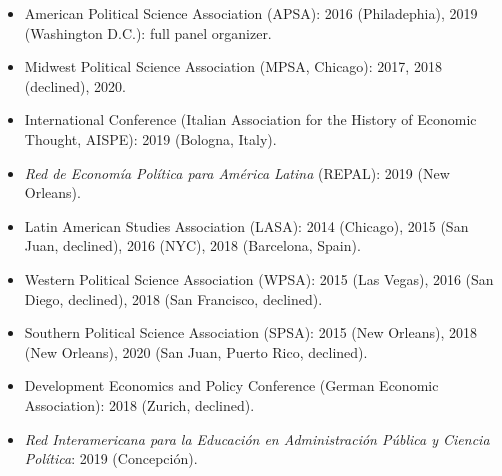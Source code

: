 \begin{itemize}
\item American Political Science Association (APSA): 2016 (Philadephia), 2019 (Washington D.C.): full panel organizer.
\item Midwest Political Science Association (MPSA, Chicago): 2017, 2018 (declined), 2020.
\item International Conference (Italian Association for the History of Economic Thought, AISPE): 2019 (Bologna, Italy).
\item \emph{Red de Econom\'ia Pol\'itica para Am\'erica Latina} (REPAL): 2019 (New Orleans).
\item Latin American Studies Association (LASA): 2014 (Chicago), 2015 (San Juan, declined), 2016 (NYC), 2018 (Barcelona, Spain).
\item Western Political Science Association (WPSA): 2015 (Las Vegas), 2016 (San Diego, declined), 2018 (San Francisco, declined).
\item Southern Political Science Association (SPSA): 2015 (New Orleans), 2018 (New Orleans), 2020 (San Juan, Puerto Rico, declined).
\item Development Economics and Policy Conference (German Economic Association): 2018 (Zurich, declined).
\item \emph{Red Interamericana para la Educaci\'on en Administraci\'on P\'ublica y Ciencia Pol\'itica}: 2019 (Concepci\'on).
\end{itemize}
